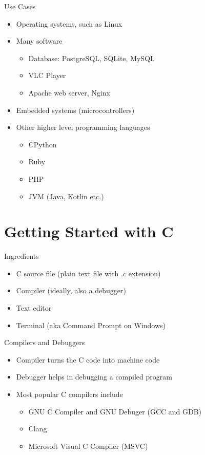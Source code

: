 \documentclass[12pt, aspectratio=169]{beamer}
\begin{document}
    \begin{frame}{Use Cases}
        \begin{itemize}
            \item Operating systems, such as Linux
            \item Many software
            \begin{itemize}
                \item Database: PostgreSQL, SQLite, MySQL
                \item VLC Player
                \item Apache web server, Nginx
            \end{itemize}
            \item Embedded systems (microcontrollers)
            \item Other higher level programming languages
            \begin{itemize}
                \item CPython
                \item Ruby
                \item PHP
                \item JVM (Java, Kotlin etc.)
            \end{itemize}
        \end{itemize}
    \end{frame}


    \section{Getting Started with C}

    \begin{frame}{Ingredients}
        \begin{itemize}
            \item C source file (plain text file with .c extension)
            \item Compiler (ideally, also a debugger)
            \item Text editor
            \item Terminal (aka Command Prompt on Windows)
        \end{itemize}
    \end{frame}

    \begin{frame}{Compilers and Debuggers}
        \begin{itemize}
            \item Compiler turns the C code into machine code
            \item Debugger helps in debugging a compiled program
            \item Most popular C compilers include
            \begin{itemize}
                \item GNU C Compiler and GNU Debuger (GCC and GDB)
                \item Clang
                \item Microsoft Visual C Compiler (MSVC)
            \end{itemize}
        \end{itemize}
    \end{frame}
\end{document}
